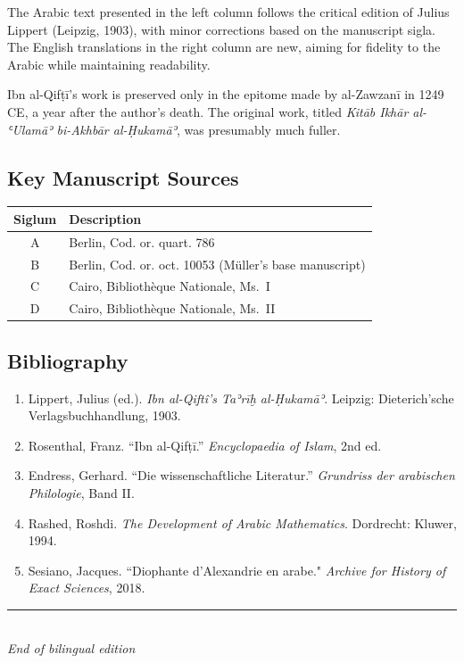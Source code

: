 \documentclass[11pt,a4paper]{article}
\begin{document}
The Arabic text presented in the left column follows the critical edition of Julius Lippert (Leipzig, 1903), with minor corrections based on the manuscript sigla. The English translations in the right column are new, aiming for fidelity to the Arabic while maintaining readability.

Ibn al-Qifṭī's work is preserved only in the epitome made by al-Zawzanī in 1249 CE, a year after the author's death. The original work, titled \textit{Kitāb Ikh\={a}r al-ʿUlamāʾ bi-Akhbār al-Ḥukamāʾ}, was presumably much fuller.

\subsection{Key Manuscript Sources}

\begin{center}
\begin{tabular}{cl}
\toprule
\textbf{Siglum} & \textbf{Description} \\
\midrule
A & Berlin, Cod. or. quart. 786 \\
B & Berlin, Cod. or. oct. 10053 (Müller's base manuscript) \\
C & Cairo, Bibliothèque Nationale, Ms.~I \\
D & Cairo, Bibliothèque Nationale, Ms.~II \\
\bottomrule
\end{tabular}
\end{center}

\subsection{Bibliography}

\begin{enumerate}[leftmargin=2em]
  \item Lippert, Julius (ed.). \textit{Ibn al-Qiftî's Taʾrīḫ al-Ḥukamāʾ}. Leipzig: Dieterich'sche Verlagsbuchhandlung, 1903.
  \item Rosenthal, Franz. ``Ibn al-Qifṭī.'' \textit{Encyclopaedia of Islam}, 2nd ed.
  \item Endress, Gerhard. ``Die wissenschaftliche Literatur.'' \textit{Grundriss der arabischen Philologie}, Band II.
  \item Rashed, Roshdi. \textit{The Development of Arabic Mathematics}. Dordrecht: Kluwer, 1994.
  \item Sesiano, Jacques. ``Diophante d'Alexandrie en arabe." \textit{Archive for History of Exact Sciences}, 2018.
\end{enumerate}

\vspace{1cm}
\begin{center}
\noindent\rule{0.5\textwidth}{0.4pt}\\[0.5em]
\textit{End of bilingual edition}
\end{center}
\end{document}

